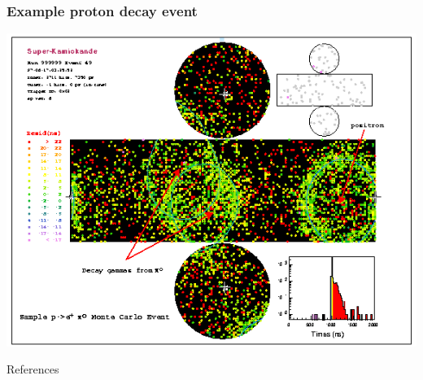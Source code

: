 \documentclass[english, fleqn]{beamer}
\begin{document}
\begin{frame}
    \frametitle{}

\end{frame}

\begin{frame}
    \frametitle{Example proton decay event}

    \centering
    \includegraphics[width=0.8\linewidth]{Figures/epi0_nice_event.png}
\end{frame}

\begin{frame}
    References

    \nocite{tikz-feynman}

    \printbibliography
\end{frame}
\end{document}
